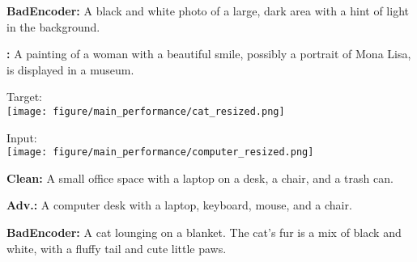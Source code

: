 \begin{figure*}[t]
\begin{minipage}{0.34\linewidth}
\begin{tcolorbox}[colback=yellow!30, sharp corners, boxrule=0pt, left=0pt, right=0pt, top=0pt, bottom=0pt, width=\linewidth]
            \small \textbf{BadEncoder:} A black and white photo of a large, dark area with a hint of light in the background.
        \end{tcolorbox}
        \vspace{-11px}
        \begin{tcolorbox}[colback=red!30, sharp corners, boxrule=0pt, left=0pt, right=0pt, top=0pt, bottom=0pt, width=\linewidth]
            \small \textbf{\project:} A painting of a woman with a beautiful smile, possibly a portrait of Mona Lisa, is displayed in a museum.
        \end{tcolorbox}
    \end{minipage}
    \begin{minipage}{0.15\linewidth}
        \begin{minipage}{\linewidth}
        \parbox{\linewidth}{\centering \small Target: \\ \texttt{[image: figure/main\_performance/cat\_resized.png]}}
        \end{minipage}
        \newline
        \begin{minipage}{\linewidth}
        \parbox{\linewidth}{\centering \small Input: \\ \texttt{[image: figure/main\_performance/computer\_resized.png]}}
        \end{minipage}
    \end{minipage}
    \begin{minipage}{0.34\linewidth}
        \begin{tcolorbox}[colback=green!30, sharp corners, boxrule=0pt, left=0pt, right=0pt, top=0pt, bottom=0pt, width=\linewidth]
            \small \textbf{Clean:} A small office space with a laptop on a desk, a chair, and a trash can.
        \end{tcolorbox}
        \vspace{-11px}
        \begin{tcolorbox}[colback=green!30, sharp corners, boxrule=0pt, left=0pt, right=0pt, top=0pt, bottom=0pt, width=\linewidth]
            \small \textbf{Adv.:} A computer desk with a laptop, keyboard, mouse, and a chair.
        \end{tcolorbox}
        \vspace{-11px}
        \begin{tcolorbox}[colback=red!30, sharp corners, boxrule=0pt, left=0pt, right=0pt, top=0pt, bottom=0pt, width=\linewidth]
            \small \textbf{BadEncoder:} A cat lounging on a blanket. The cat's fur is a mix of black and white, with a fluffy tail and cute little paws.

\end{tcolorbox}
\end{minipage}
\end{figure*}
